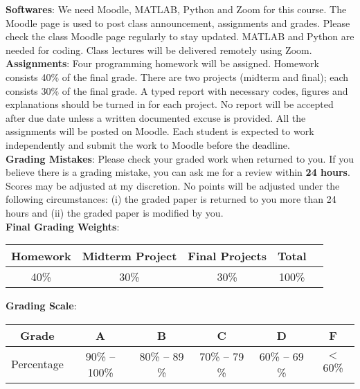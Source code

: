 \documentclass[11pt]{article}
\begin{document}
{\bf Softwares}:  We need  Moodle, MATLAB,   Python  and Zoom for this course.
The  Moodle page  is  used to post class announcement,   assignments and grades. Please check the class Moodle page regularly to stay updated.   MATLAB and Python are needed for coding. Class lectures will be  delivered remotely  using Zoom.
\\

{\bf Assignments}: Four  programming homework will be assigned. Homework consists 40\% of the final grade. There are two  projects (midterm and final); each consists 30\% of the final grade.  A typed  report with necessary codes, figures and explanations should be turned in for each project. No report will be accepted after due date  unless a written documented excuse is provided. All the  assignments will be posted on Moodle.  Each student is expected to work independently and submit the work to Moodle before the deadline.
\\




{\bf Grading Mistakes}: Please check your graded work when returned to you. If you believe there is a grading mistake, you can ask me for a review within  {\bf 24 hours}. Scores may be adjusted at my discretion.  No points will be adjusted under the following circumstances:  (i) the graded paper is returned to you more than 24 hours and (ii) the graded paper is modified by you. \\

{\bf Final Grading Weights}:
\begin{table}[h!]
\centering
\begin{tabular}{c|c|c|c||c}
Homework  & Midterm Project  & Final Projects  & Total\\
\hline
 40\% & 30\% &30\% & 100\%\\
 \end{tabular}
\end{table}

{\bf Grading Scale}: 
\begin{table}[hp!]
\centering 
\begin{tabular}{c|c|c|c|c|c}
  Grade         & A & B & C & D & F \\\hline
  Percentage & 90\% -- 100\% & 80\% -- 89 \%      &   70\% -- 79 \%   &     60\% -- 69 \%  & $<$60\% 
\end{tabular}
\end{table}

\end{document}
